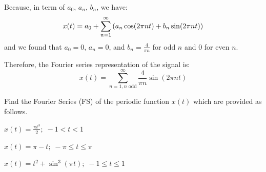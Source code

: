 \documentclass[a4paper, 10pt]{article}
\begin{document}
\begin{solution}
Because, in term of \( a_0 \), \( a_n \), \( b_n \), we have:
\[ x(t) = a_0 + \sum_{n=1}^{\infty} \left( a_n \cos(2\pi n t) + b_n \sin(2\pi n t) \right) \]
and we found that \( a_0 = 0 \), \( a_n = 0 \), and \( b_n = \frac{4}{\pi n} \) for odd \( n \) and \( 0 \) for even \( n \).

Therefore, the Fourier series representation of the signal is:
\[ x(t) = \sum_{n=1, n \text{ odd}}^{\infty} \frac{4}{\pi n} \sin(2\pi n t) \]
\end{solution}

\newpage

\begin{problem}
Find the Fourier Series (FS) of the periodic function \( x(t) \) which are provided as follows.
\end{problem}


\begin{subproblems}[start=1]
    \item \( x(t) = \frac{\pi t^3}{2};\; -1 < t < 1 \)
\end{subproblems}

\begin{solution}

\end{solution}

\newpage 

\begin{tosubmit}
\begin{subproblems}[start=2]
    \item \( x(t) = \pi - t;\; -\pi \leq t \leq \pi \)
\end{subproblems}

\par\noindent\submitsolution

\end{tosubmit}

\newpage

\begin{tosubmit}
\begin{subproblems}[start=3]
    \item \( x(t) = t^2 + \sin^3(\pi t);\; -1 \leq t \leq 1 \)
\end{subproblems}

\par\noindent\submitsolution

\end{tosubmit}
\end{document}
